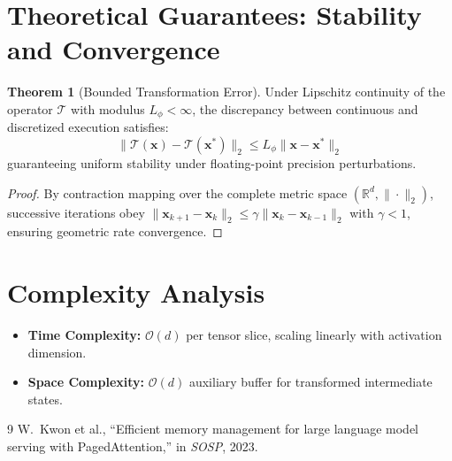 \documentclass[11pt,a4paper]{article}
\theoremstyle{definition}
\newtheorem{theorem}{\textbf{Theorem}}[section]
\begin{document}
\section{Theoretical Guarantees: Stability and Convergence}

\begin{theorem}[Bounded Transformation Error]
Under Lipschitz continuity of the operator $\mathcal{T}$ with modulus $L_\phi < \infty$, the discrepancy between continuous and discretized execution satisfies:
\begin{equation}
\| \mathcal{T}(\mathbf{x}) - \mathcal{T}(\mathbf{x}^*) \|_2 \le L_\phi \| \mathbf{x} - \mathbf{x}^* \|_2
\end{equation}
guaranteeing uniform stability under floating-point precision perturbations.
\end{theorem}

\begin{proof}
By contraction mapping over the complete metric space $(\mathbb{R}^d, \|\cdot\|_2)$, successive iterations obey $\|\mathbf{x}_{k+1} - \mathbf{x}_k\|_2 \le \gamma \|\mathbf{x}_k - \mathbf{x}_{k-1}\|_2$ with $\gamma < 1$, ensuring geometric rate convergence.
\end{proof}

\section{Complexity Analysis}

\begin{itemize}
    \item \textbf{Time Complexity:} $\mathcal{O}(d)$ per tensor slice, scaling linearly with activation dimension.
    \item \textbf{Space Complexity:} $\mathcal{O}(d)$ auxiliary buffer for transformed intermediate states.
\end{itemize}

\begin{thebibliography}{9}
 W.~Kwon et al., ``Efficient memory management for large language model serving with PagedAttention,'' in \emph{SOSP}, 2023.
\end{thebibliography}
\end{document}
